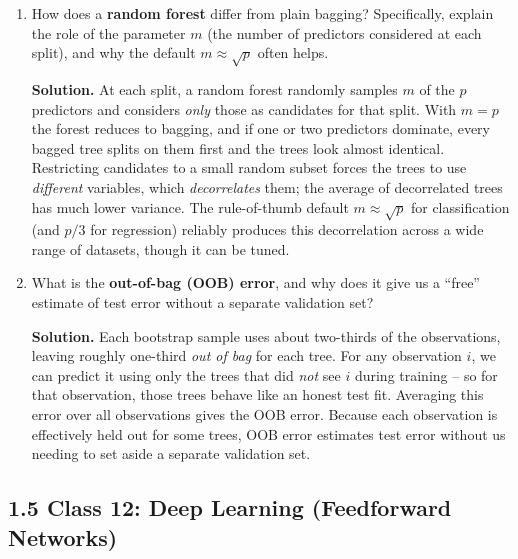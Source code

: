 \documentclass[11pt]{article}
\newcommand{\solution}[1]{%
  \par\medskip\noindent\textbf{Solution.} #1\par\medskip
}
\begin{document}
\begin{enumerate}[leftmargin=*, resume]
\item How does a \textbf{random forest} differ from plain bagging? Specifically, explain the role of the parameter $m$ (the number of predictors considered at each split), and why the default $m \approx \sqrt p$ often helps.

\solution{At each split, a random forest randomly samples $m$ of the $p$ predictors and considers \emph{only} those as candidates for that split. With $m = p$ the forest reduces to bagging, and if one or two predictors dominate, every bagged tree splits on them first and the trees look almost identical. Restricting candidates to a small random subset forces the trees to use \emph{different} variables, which \emph{decorrelates} them; the average of decorrelated trees has much lower variance. The rule-of-thumb default $m \approx \sqrt p$ for classification (and $p/3$ for regression) reliably produces this decorrelation across a wide range of datasets, though it can be tuned.}

\item What is the \textbf{out-of-bag (OOB) error}, and why does it give us a ``free'' estimate of test error without a separate validation set?

\solution{Each bootstrap sample uses about two-thirds of the observations, leaving roughly one-third \emph{out of bag} for each tree. For any observation $i$, we can predict it using only the trees that did \emph{not} see $i$ during training -- so for that observation, those trees behave like an honest test fit. Averaging this error over all observations gives the OOB error. Because each observation is effectively held out for some trees, OOB error estimates test error without us needing to set aside a separate validation set.}

\end{enumerate}


\subsection*{1.5 Class 12: Deep Learning (Feedforward Networks)}
\end{document}
